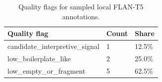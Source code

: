 \begin{table}[htbp]
\centering
\caption{Quality flags for sampled local FLAN-T5 annotations.}
\label{tab:enhanced_llm_quality}
\begin{tabular}{lll}
\hline
Quality flag & Count & Share \\
\hline
candidate_interpretive_signal & 1 & 12.5\% \\
low_boilerplate_like & 2 & 25.0\% \\
low_empty_or_fragment & 5 & 62.5\% \\
\hline
\end{tabular}
\end{table}
